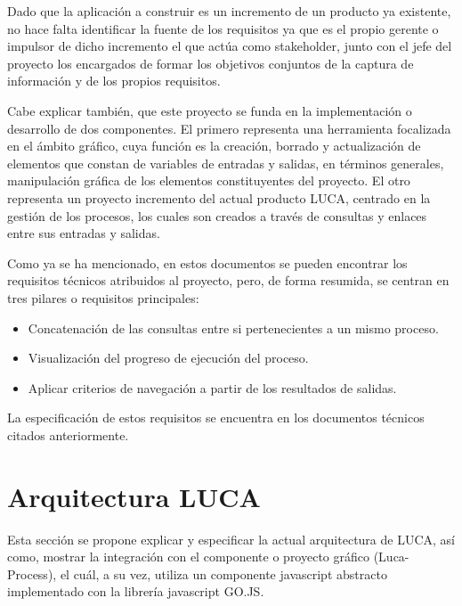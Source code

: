 \vspace{5mm}

Dado que la aplicación a construir es un incremento de un producto ya existente, no hace falta identificar la fuente de los requisitos ya que es el propio gerente o impulsor de dicho incremento el que actúa como stakeholder, junto con el jefe del proyecto los encargados de formar los objetivos conjuntos de la captura de información y de los propios requisitos.

\vspace{5mm}

Cabe explicar también, que este proyecto se funda en la implementación o desarrollo de dos componentes. El primero representa una herramienta focalizada en el ámbito gráfico, cuya función es la creación, borrado y actualización de elementos que constan de variables de entradas y salidas, en términos generales, manipulación gráfica de los elementos constituyentes del proyecto. El otro representa un proyecto incremento del actual producto LUCA, centrado en la gestión de los procesos, los cuales son creados a través de consultas y enlaces entre sus entradas y salidas.

\vspace{5mm}

Como ya se ha mencionado, en estos documentos se pueden encontrar los requisitos técnicos atribuidos al proyecto, pero, de forma resumida, se centran en tres pilares o requisitos principales:

\begin{itemize}
	\item  Concatenación de las consultas entre si pertenecientes a un mismo proceso.
	\item  Visualización del progreso de ejecución del proceso.
	\item Aplicar criterios de navegación a partir de los resultados de salidas.
\end{itemize}

La especificación de estos requisitos se encuentra en los documentos técnicos citados anteriormente.



\section{Arquitectura LUCA}

Esta sección se propone explicar y especificar la actual arquitectura de LUCA, así como, mostrar la integración con el componente o proyecto gráfico (Luca-Process), el cuál, a su vez, utiliza un componente javascript abstracto implementado con la librería javascript GO.JS.


